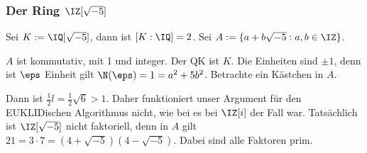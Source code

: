 \subsubsection{Der Ring $\IZ[\sqrt{-5}]$}

Sei $K:=\IQ[\sqrt{-5}]$, dann ist $[K:\IQ]=2$. Sei $A:=\{a+b\sqrt{-5} : a,b\in\IZ\}$.

$A$ ist kommutativ, mit 1 und integer. Der QK ist $K$. Die Einheiten sind $\pm 1$, denn ist $\eps$ Einheit gilt $\N(\eps)=1=a^2+5b^2$. Betrachte ein \glqq Kästchen\grqq{} in $A$.
\begin{center}
\end{center}

Dann ist $\frac{1}{2}l=\frac{1}{2}\sqrt{6}>1$. Daher funktioniert unser Argument für den EUKLIDischen Algorithmus nicht, wie bei es bei $\IZ[i]$ der Fall war. Tatsächlich ist $\IZ[\sqrt{-5}]$ nicht faktoriell, denn in $A$ gilt $21=3\cdot 7=(4+\sqrt{-5})(4-\sqrt{-5})$. Dabei sind alle Faktoren prim.

